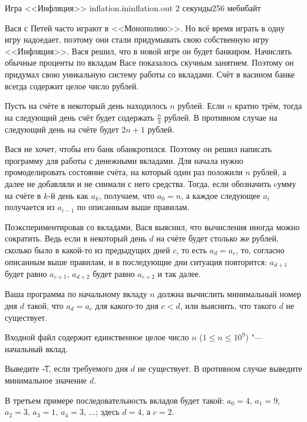 
\begin{problem}{Игра <<Инфляция>>}
{inflation.in}{inflation.out}
{2 секунды}{256 мебибайт}{}

Вася с Петей часто играют в <<Монополию>>.
Но всё время играть в одну игру надоедает,
поэтому они стали придумывать свою собственную игру <<Инфляция>>.
Вася решил, что в новой игре он будет банкиром.
Начислять обычные проценты по вкладам Васе показалось скучным занятием.
Поэтому он придумал свою уникальную систему работы со вкладами.
Счёт в васином банке всегда содержит целое число рублей.

Пусть на счёте в некоторый день находилось $n$ рублей.
Если $n$ кратно трём, тогда на следующий день счёт будет
содержать $\frac{n}{3}$ рублей.
В противном случае на следующий день на счёте будет $2 n + 1$ рублей.

Вася не хочет, чтобы его банк обанкротился.
Поэтому он решил написать программу для работы с денежными вкладами.
Для начала нужно промоделировать состояние счёта, на который один раз
положили $n$ рублей, а далее не добавляли и не снимали с него средства.
Тогда, если обозначить cумму на счёте в $k$-й день как $a_k$,
получаем, что $a_0 = n$, а каждое следующее $a_i$ получается из $a_{i - 1}$
по описанным выше правилам.

Поэкспериментировав со вкладами, Вася выяснил, что вычисления иногда
можно сократить.
Ведь если в некоторый день $d$ на счёте будет столько же рублей,
сколько было в какой-то из предыдущих дней $c$, то есть $a_d = a_c$, то,
согласно описанным выше правилам, и в последующие дни ситуация повторится:
$a_{d + 1}$ будет равно $a_{c + 1}$, $a_{d + 2}$ будет равно $a_{c + 2}$
и так далее.

Ваша программа по начальному вкладу $n$ должна вычислить
минимальный номер дня $d$ такой, что $a_d = a_c$ для какого-то дня $c < d$,
или выяснить, что такого $d$ не существует.

\InputFile

Входной файл содержит единственное целое число $n$ ($1 \le n \le 10^9$)
"--- начальный вклад.

\OutputFile

Выведите \t{-1}, если требуемого дня $d$ не существует.
В противном случае выведите минимальное значение $d$.

\Examples

\begin{example}
%
%
%
%
\end{example}

\Explanation

В третьем примере последовательность вкладов будет такой:
$a_0 = 4$, $a_1 = 9$, $a_2 = 3$, $a_3 = 1$, $a_4 = 3$, $\ldots$;
здесь $d = 4$, а $c = 2$.

\end{problem}

